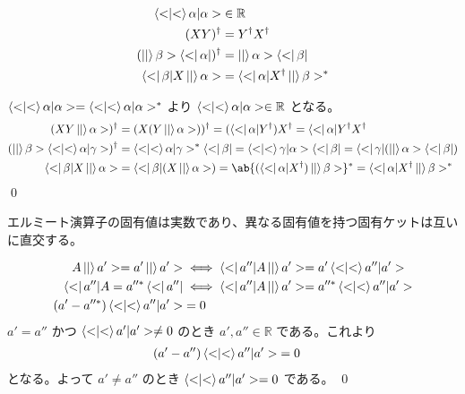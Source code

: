 \documentclass[uplatex,dvipdfmx,a4paper,11pt]{jlreq}
\makeatletter
\newcommand{\RR}{\mathbb{R}}
\numberwithin{equation}{section}
\theoremstyle{definition}
\renewenvironment{proof}[1][\proofname]{\par
  \normalfont
  \topsep6\p@\@plus6\p@ \trivlist
  \item[\hskip\labelsep{\bfseries #1}\@addpunct{\bfseries}]\ignorespaces\quad\par
}{%
  \qed\endtrivlist\@endpefalse
}
\renewcommand\proofname{証明}
\makeatother
\begin{document}
\begin{proposition}
  \begin{align}
    \braket<\alpha|\alpha>            & \in\RR                               \\
    (XY)^\dagger                      & = Y^\dagger X^\dagger                \\
    (\ket|\beta>\bra<\alpha|)^\dagger & = \ket|\alpha>\bra<\beta|            \\
    \bra<\beta|X\ket|\alpha>          & = \bra<\alpha|X^\dagger\ket|\beta>^*
  \end{align}
\end{proposition}
\begin{proof}
  $\braket<\alpha|\alpha> = \braket<\alpha|\alpha>^*$ より $\braket<\alpha|\alpha>\in\RR$ となる。
  \begin{align}
    (XY\ket|\alpha>)^\dagger                    & = (X(Y\ket|\alpha>))^\dagger = (\bra<\alpha|Y^\dagger)X^\dagger = \bra<\alpha|Y^\dagger X^\dagger                 \\
    (\ket|\beta>\braket<\alpha|\gamma>)^\dagger & = \braket<\alpha|\gamma>^*\bra<\beta| = \braket<\gamma|\alpha>\bra<\beta| = \bra<\gamma|(\ket|\alpha>\bra<\beta|) \\
    \bra<\beta|X\ket|\alpha>                    & = \bra<\beta|(X\ket|\alpha>) = \ab\{(\bra<\alpha|X^\dagger)\ket|\beta>\}^* = \bra<\alpha|X^\dagger\ket|\beta>^*
  \end{align}
\end{proof}

\begin{theorem}[エルミート演算子の固有ケットの直交性]
  エルミート演算子の固有値は実数であり、異なる固有値を持つ固有ケットは互いに直交する。
\end{theorem}
\begin{proof}
  \begin{align}
    A\ket|a'> = a'\ket|a'>      & \iff \bra<a''|A\ket|a'> = a'\braket<a''|a'>    \\
    \bra<a''|A = a''^*\bra<a''| & \iff \bra<a''|A\ket|a'> = a''^*\braket<a''|a'> \\
    (a' - a''^*)\braket<a''|a'> & = 0
  \end{align}
  $a' = a''$ かつ $\braket<a'|a'> \neq 0$ のとき $a', a''\in\RR$ である。これより
  \begin{align}
    (a' - a'')\braket<a''|a'> & = 0
  \end{align}
  となる。よって $a' \neq a''$ のとき $\braket<a''|a'> = 0$ である。
\end{proof}
\end{document}

